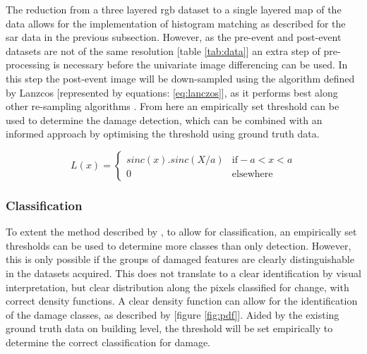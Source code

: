 \noindent The reduction from a three layered \ac{rgb} dataset to a single layered map of the data allows for the implementation of histogram matching as described for the \ac{sar} data in the previous subsection. However, as the pre-event and post-event datasets are not of the same resolution [table \ref{tab:data}] an extra step of pre-processing is necessary before the univariate image differencing can be used. In this step the post-event image will be down-sampled using the algorithm defined by Lanzcos [represented by equations: \ref{eq:lanczos}], as it performs best along other re-sampling algorithms \citep{Narendra2013}. From here an empirically set threshold can be used to determine the damage detection, which can be combined with an informed approach by optimising the threshold using ground truth data.

\begin{equation}
L(x) = 
\begin{cases} 
sinc(x).sinc(X/a) & \text{if} -a < x < a\\
0 & \text{elsewhere}
\end{cases}
\label{eq:lanczos}
\end{equation}

\subsubsection*{Classification}
To extent the method described by \citet{Yun2015}, to allow for classification, an empirically set thresholds can be used to determine more classes than only detection. However, this is only possible if the groups of damaged features are clearly distinguishable in the datasets acquired. This does not translate to a clear identification by visual interpretation, but clear distribution along the pixels classified for change, with correct density functions. A clear density function can allow for the identification of the damage classes, as described by \citet{Theodoridis2009} [figure \ref{fig:pdf}]. Aided by the existing ground truth data on building level, the threshold will be set empirically to determine the correct classification for damage.

